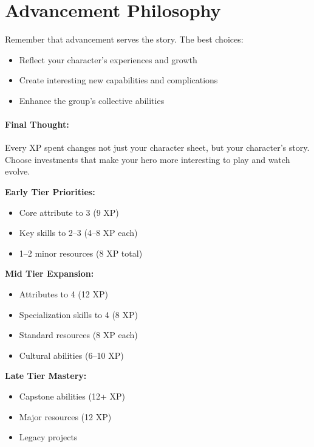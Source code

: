 \section{Advancement Philosophy}

Remember that advancement serves the story. The best choices:
\begin{itemize}
\item Reflect your character's experiences and growth
\item Create interesting new capabilities and complications
\item Enhance the group's collective abilities
\end{itemize}

\paragraph{Final Thought:}  
Every XP spent changes not just your character sheet, but your character's story. Choose investments that make your hero more interesting to play and watch evolve.

\begin{tcolorbox}[colback=green!5!white,colframe=green!75!black,title=XP Planning Guide,fonttitle=\bfseries]
\textbf{Early Tier Priorities:}
\begin{itemize}
\item Core attribute to 3 (9 XP)
\item Key skills to 2–3 (4–8 XP each)
\item 1–2 minor resources (8 XP total)
\end{itemize}

\textbf{Mid Tier Expansion:}
\begin{itemize}
\item Attributes to 4 (12 XP)
\item Specialization skills to 4 (8 XP)
\item Standard resources (8 XP each)
\item Cultural abilities (6–10 XP)
\end{itemize}

\textbf{Late Tier Mastery:}
\begin{itemize}
\item Capstone abilities (12+ XP)
\item Major resources (12 XP)
\item Legacy projects
\end{itemize}
\end{tcolorbox}

